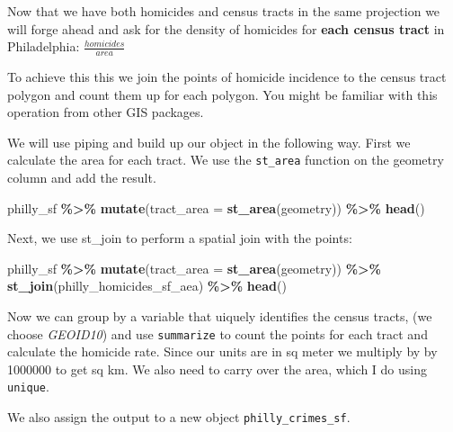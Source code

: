 \documentclass[
]{book}
\newenvironment{Shaded}{\begin{snugshade}}{\end{snugshade}}
\newcommand{\AttributeTok}[1]{\textcolor[rgb]{0.13,0.29,0.53}{#1}}
\newcommand{\FunctionTok}[1]{\textcolor[rgb]{0.13,0.29,0.53}{\textbf{#1}}}
\newcommand{\NormalTok}[1]{#1}
\newcommand{\SpecialCharTok}[1]{\textcolor[rgb]{0.81,0.36,0.00}{\textbf{#1}}}
\begin{document}
Now that we have both homicides and census tracts in the same projection we will forge ahead and ask for the density of homicides for \textbf{each census tract} in Philadelphia: \(\frac{{homicides}}{area}\)

To achieve this this we join the points of homicide incidence to the census tract polygon and count them up for each polygon. You might be familiar with this operation from other GIS packages.

We will use piping and build up our object in the following way. First we calculate the area for each tract. We use the \texttt{st\_area} function on the geometry column and add the result.

\begin{Shaded}
\begin{Highlighting}[]
\NormalTok{philly\_sf }\SpecialCharTok{\%\textgreater{}\%} 
  \FunctionTok{mutate}\NormalTok{(}\AttributeTok{tract\_area =} \FunctionTok{st\_area}\NormalTok{(geometry)) }\SpecialCharTok{\%\textgreater{}\%} 
  \FunctionTok{head}\NormalTok{()}
\end{Highlighting}
\end{Shaded}

Next, we use st\_join to perform a spatial join with the points:

\begin{Shaded}
\begin{Highlighting}[]
\NormalTok{philly\_sf }\SpecialCharTok{\%\textgreater{}\%} 
  \FunctionTok{mutate}\NormalTok{(}\AttributeTok{tract\_area =} \FunctionTok{st\_area}\NormalTok{(geometry)) }\SpecialCharTok{\%\textgreater{}\%} 
  \FunctionTok{st\_join}\NormalTok{(philly\_homicides\_sf\_aea) }\SpecialCharTok{\%\textgreater{}\%}
  \FunctionTok{head}\NormalTok{()}
\end{Highlighting}
\end{Shaded}

Now we can group by a variable that uiquely identifies the census tracts, (we choose \emph{GEOID10}) and use \texttt{summarize} to count the points for each tract and calculate the homicide rate. Since our units are in sq meter we multiply by by 1000000 to get sq km. We also need to carry over the area, which I do using \texttt{unique}.

We also assign the output to a new object \texttt{philly\_crimes\_sf}.
\end{document}
